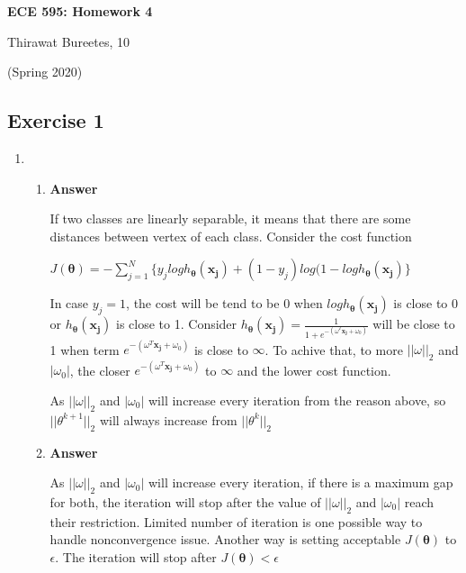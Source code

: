 \documentclass[11pt]{article}
\begin{document}
\begin{center}
\Large{\textbf{ECE 595: Homework 4}}

Thirawat Bureetes, 10

(Spring 2020)
\end{center}

\subsection*{Exercise 1}

\begin{enumerate}[label=(\alph*)]


\item 

\begin{enumerate}[label=(\roman*)]

\item 

\noindent\textbf{Answer}

If two classes are linearly separable, it means that there are some distances between vertex of each class. 
Consider the cost function 

$J(\mathbf{\theta}) = - \sum_{j=1}^N{\{y_jlogh_{\mathbf{\theta}}(\mathbf{x_j})+(1-y_j)log(1-logh_{\mathbf{\theta}}(\mathbf{x_j})\}}$ 

In case $y_j = 1$, the cost will be tend to be 0 when $logh_{\mathbf{\theta}}(\mathbf{x_j})$ is close to 0 or $h_{\mathbf{\theta}}(\mathbf{x_j})$ is close to 1. 
Consider $h_{\mathbf{\theta}}(\mathbf{x_j}) = \frac{1}{1+e^{-(\omega^T\mathbf{x_j}+\omega_0)}}$ will be close to 1 when term $e^{-(\omega^T\mathbf{x_j}+\omega_0)}$ is close to $\infty$. To achive that, to more $||\omega||_2$ and $|\omega_0|$, the closer $e^{-(\omega^T\mathbf{x_j}+\omega_0)}$ to $\infty$ and the lower cost function. 

As $||\omega||_2$ and $|\omega_0|$ will increase every iteration from the reason above, so $||\theta^{k+1}||_2$ will always increase from $||\theta^{k}||_2$ 

\item 

\noindent\textbf{Answer}

As $||\omega||_2$ and $|\omega_0|$  will increase every iteration, if there is a maximum gap for both, the iteration will stop after the value of $||\omega||_2$ and $|\omega_0|$ reach their restriction. Limited number of iteration is one possible way to handle nonconvergence issue. Another way is setting acceptable $J(\mathbf{\theta})$ to $\epsilon$. The iteration will stop after $J(\mathbf{\theta}) < \epsilon$


\end{enumerate}
\end{enumerate}
\end{document}
